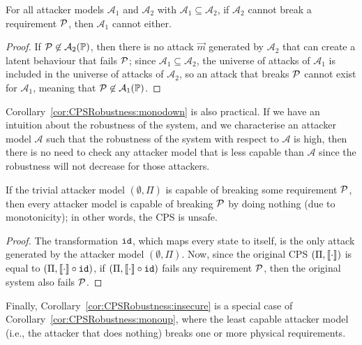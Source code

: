 {\begin{corollary}
  \label{cor:CPSRobustness:monodown}
  For all attacker models $\mathcal{A}_1$ and $\mathcal{A}_2$ with $\mathcal{A}_1\subseteq \mathcal{A}_2$, if $\mathcal{A}_2$ cannot break a requirement $\mathcal{P}$, then $\mathcal{A}_1$ cannot either.
  \end{corollary}
  \begin{proof}
  If $\mathcal{P}\not\in\mathcal{A}_2(\mathbb{P})$, then there is no attack $\vec{m}$ generated by $\mathcal{A}_2$ that can create a latent behaviour that fails $\mathcal{P}$; since $\mathcal{A}_1\subseteq \mathcal{A}_2$, the universe of attacks of $\mathcal{A}_1$ is included in the universe of attacks of $\mathcal{A}_2$, so an attack that breaks $\mathcal{P}$ cannot exist for $\mathcal{A}_1$, meaning that $\mathcal{P}\not\in\mathcal{A}_1(\mathbb{P})$.
  \end{proof}
  Corollary~\ref{cor:CPSRobustness:monodown} is also practical. If we have an intuition about the robustness of the system, and we characterise an attacker model $\mathcal{A}$ such that the robustness of the system with respect to $\mathcal{A}$ is high, then there is no need to check any attacker model that is less capable than $\mathcal{A}$ since the robustness will not decrease for those attackers.%

\begin{corollary}
  \label{cor:CPSRobustness:insecure}
  If the trivial attacker model $(\emptyset,\Pi)$ is capable of breaking some requirement $\mathcal{P}$, then every attacker model is capable of breaking $\mathcal{P}$ by doing nothing (due to monotonicity); in other words, the CPS is unsafe.
\end{corollary}
\begin{proof}
  The transformation ${\texttt{id}}$, which maps every state to itself, is the only attack generated by the attacker model $(\emptyset,\Pi)$. Now, since the original CPS $(\Pi,{{{\llbracket\cdot\rrbracket}}})$ is equal to $(\Pi,{{{\llbracket\cdot\rrbracket}}}\circ {\texttt{id}})$, if $(\Pi,{{{\llbracket\cdot\rrbracket}}}\circ {\texttt{id}})$ fails any requirement $\mathcal{P}$, then the original system also fails $\mathcal{P}$. %
\end{proof}
Finally, Corollary~\ref{cor:CPSRobustness:insecure} is a special case of Corollary~\ref{cor:CPSRobustness:monoup}, where the least capable attacker model (i.e., the attacker that does nothing) breaks one or more physical requirements. %
 
}
